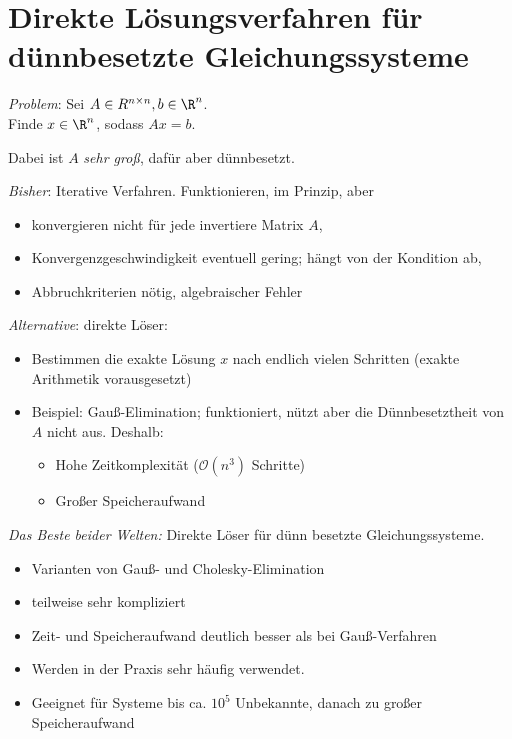 \chapter{Direkte Lösungsverfahren für dünnbesetzte Gleichungssysteme}
\label{sec:direct_sparse_solvers}

\emph{Problem}: Sei $A \in R^{n \times n}, b \in \R^n$.\\
Finde $x \in \R^n$, sodass $Ax=b$.

Dabei ist $A$ \emph{sehr groß}, dafür aber dünnbesetzt.

\bigskip

\emph{Bisher}: Iterative Verfahren. Funktionieren, im Prinzip, aber
\begin{itemize}
 \item konvergieren nicht für jede invertiere Matrix $A$,
 \item Konvergenzgeschwindigkeit eventuell gering; hängt von der Kondition ab,
 \item Abbruchkriterien nötig, algebraischer Fehler
\end{itemize}

\medskip

\emph{Alternative}: direkte Löser:
\begin{itemize}
 \item Bestimmen die exakte Lösung $x$ nach endlich vielen Schritten (exakte Arithmetik vorausgesetzt)
 \item Beispiel: Gauß-Elimination; funktioniert, nützt aber die Dünnbesetztheit
   von $A$ nicht aus.  Deshalb:
  \begin{itemize}
   \item Hohe Zeitkomplexität ($\mathcal{O} (n^3)$ Schritte)
   \item Großer Speicheraufwand
  \end{itemize}
\end{itemize}

\medskip

\emph{Das Beste beider Welten:} Direkte Löser für dünn besetzte Gleichungssysteme.
\begin{itemize}
 \item Varianten von Gauß- und Cholesky-Elimination
 \item teilweise sehr kompliziert
 \item Zeit- und Speicheraufwand deutlich besser als bei Gauß-Verfahren
 \item Werden in der Praxis sehr häufig verwendet.
 \item Geeignet für Systeme bis ca. $10^5$ Unbekannte, danach zu großer Speicheraufwand
\end{itemize}


